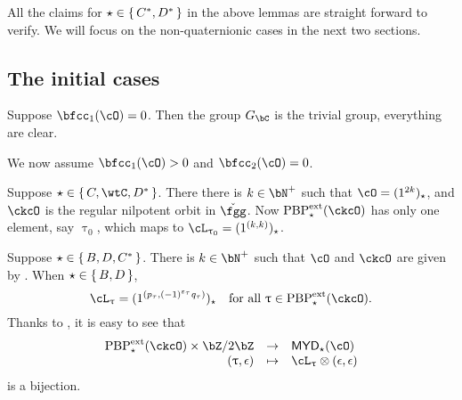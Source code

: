 \documentclass[12pt,a4paper]{amsart}
\def\MYD{{\mathsf{MYD}}}
\def\Forall{\text{for all }}
\def\ac{\cL}
\numberwithin{equation}{section}
\newtheorem{lem}[thm]{Lemma}
\theoremstyle{remark}
\def\PBPes{\mathrm{PBP}^{\mathrm{ext}}_{\star}}
\begin{document}






All the claims for $\star\in \set{C^{*},D^{*}}$ in the above lemmas are straight forward to verify.
We will focus on the non-quaternionic cases in the next two sections.

\subsection{The initial cases}\label{sec:pfDC.init}
Suppose $\bfcc_{1}(\cO)=0$. Then the group $G_{\bC}$ is the trivial group,
everything are clear.

We now assume $\bfcc_{1}(\cO)>0$ and $\bfcc_{2}(\cO)=0$.

Suppose $\star \in \set{C,\wtC,D^*}$. There there is $k\in\bN^{+}$ such that
$\cO = (1^{2k})_{\star}$, and $\ckcO$ is the regular nilpotent orbit in $\ckfgg$.
Now $\PBPes(\ckcO)$ has only one element, say $\uptau_{0}$, which
maps to $\ac_{\uptau_{0}} = (1^{(k,k)})_{\star}$.

Suppose $\star \in \set{B,D,C^{*}}$. There is $k\in \bN^{+}$ such that
$\cO$ and $\ckcO$ are given by .
When $\star \in \set{B,D}$,
\[
  \ac_{\uptau} = (1^{(p_{\tau},(-1)^{\varepsilon_{\tau}}q_{\tau})})_{\star}
  \quad  \Forall \uptau\in \PBPes(\ckcO).
\]
Thanks to , it is easy to see that
\[
  \begin{array}{rcl}
    \PBPes(\ckcO)\times \bZ/2\bZ & \rightarrow & \MYD_{\star}(\cO)\\
    (\uptau,\epsilon) & \mapsto & \ac_{\uptau}\otimes (\epsilon,\epsilon)
  \end{array}
\]
is a bijection.
\end{document}
